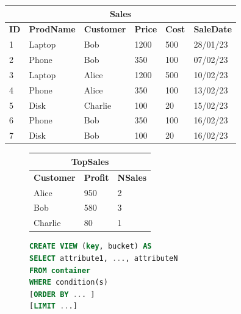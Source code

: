 \documentclass[sigplan,10pt]{acmart}
\begin{document}
\begin{table}[t]
	\setlength\tabcolsep{3.5pt}
	\small
	\begin{minipage}{0.5\textwidth}
		\centering
		\begin{tabular}{llllll}
			\multicolumn{6}{c}{\textbf{Sales}} \vspace{0.4em} \\%
					\hline
			\textbf{ID} & \textbf{ProdName} & \textbf{Customer} & \textbf{Price} & \textbf{Cost} & \textbf{SaleDate} \\ \hline
			1  & Laptop      & Bob      & 1200       & 500 & 28/01/23 \\
			2  & Phone      & Bob      & 350       & 100 & 07/02/23 \\
			3  & Laptop      & Alice      & 1200      & 500 & 10/02/23 \\
			4  & Phone      & Alice      & 350       & 100 & 13/02/23 \\
			5  & Disk      & Charlie      & 100        & 20 & 15/02/23 \\ 
			6  & Phone      & Bob      & 350       & 100 & 16/02/23 \\
			7  & Disk      & Bob      & 100       & 20 & 16/02/23 \\ \hline
		\end{tabular}
		\vspace{1em}
		\label{table:sales}
	\end{minipage}
\end{table}

\begin{figure}
	\setlength\tabcolsep{3.5pt}
	\begin{minipage}{0.19\textwidth}
		\small
		\begin{tabular}{lll}
			\multicolumn{3}{c}{\textbf{TopSales}} \vspace{0.4em}        \\
			\hline                                               
			\textbf{Customer}   & \textbf{Profit} & \textbf{NSales} \\ \hline
			Alice & 950     & 2        \\
			Bob  & 580      & 3        \\
			Charlie   & 80      & 1        \\ \hline
		\end{tabular}
		\vspace{1em}
		\label{table:topSales}
	\end{minipage} \hfill
	\begin{minipage}{0.27\textwidth}
	\begin{lstlisting}[language=SQL]
CREATE VIEW (key, bucket) AS
SELECT attribute1, ..., attributeN
FROM container
WHERE condition(s) 
[ORDER BY ... ]
[LIMIT ...]
		\end{lstlisting}
		\label{fig:viewSQL}
	\end{minipage}
\end{figure}
\end{document}
